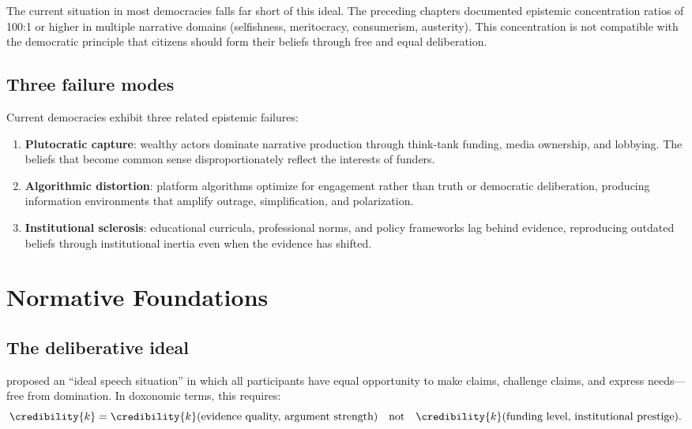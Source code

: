 The current situation in most democracies falls far short of this ideal.
The preceding chapters documented epistemic concentration ratios of 100:1 or higher in multiple narrative domains (selfishness, meritocracy, consumerism, austerity).
This concentration is not compatible with the democratic principle that citizens should form their beliefs through free and equal deliberation.

\subsection{Three failure modes}

Current democracies exhibit three related epistemic failures:

\begin{enumerate}
  \item \textbf{Plutocratic capture}: wealthy actors dominate narrative production through think-tank funding, media ownership, and lobbying.
  The beliefs that become common sense disproportionately reflect the interests of funders.

  \item \textbf{Algorithmic distortion}: platform algorithms optimize for engagement rather than truth or democratic deliberation, producing information environments that amplify outrage, simplification, and polarization.

  \item \textbf{Institutional sclerosis}: educational curricula, professional norms, and policy frameworks lag behind evidence, reproducing outdated beliefs through institutional inertia even when the evidence has shifted.
\end{enumerate}

\section{Normative Foundations}
\label{sec:ch32-normative}

\subsection{The deliberative ideal}

\textcite{habermas1962} proposed an ``ideal speech situation'' in which all participants have equal opportunity to make claims, challenge claims, and express needs---free from domination.
In doxonomic terms, this requires:
\[
  \credibility{k} = \credibility{k}(\text{evidence quality, argument strength}) \quad \text{not} \quad \credibility{k}(\text{funding level, institutional prestige}).
\]

